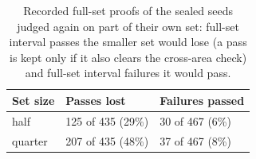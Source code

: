 \begin{table}[t]
\centering
\caption{Recorded full-set proofs of the sealed seeds judged again on part of their own set: full-set interval passes the smaller set would lose (a pass is kept only if it also clears the cross-area check) and full-set interval failures it would pass.}
\label{tab:rejudged}
\small
\begin{tabular}{lll}
\toprule
Set size & Passes lost & Failures passed \\
\midrule
half & 125 of 435 (29\%) & 30 of 467 (6\%) \\
quarter & 207 of 435 (48\%) & 37 of 467 (8\%) \\
\bottomrule
\end{tabular}
\end{table}
